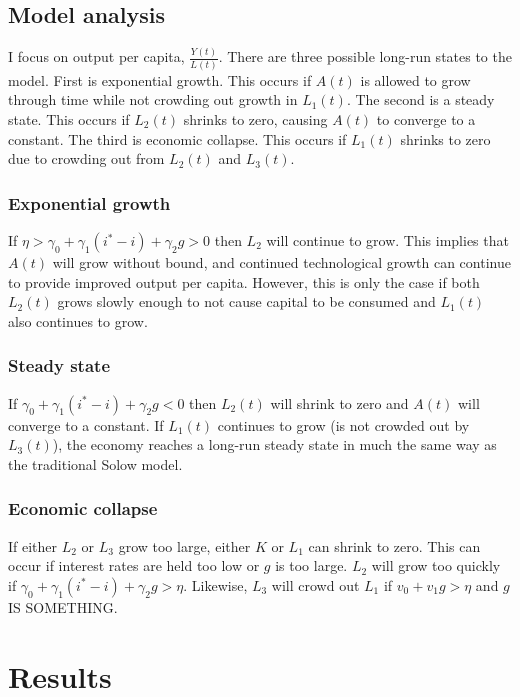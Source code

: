 \documentclass[12pt]{article}
\theoremstyle{definition}
\begin{document}
\subsection{Model analysis}

I focus on output per capita, \(\frac{Y(t)}{L(t)}\). There are three possible long-run states to the model.  First is exponential growth.  This occurs if \(A(t)\) is allowed to grow through time while not crowding out growth in \(L_1(t)\).  The second is a steady state.  This occurs if \(L_2(t)\) shrinks to zero, causing \(A(t)\) to converge to a constant.  The third is economic collapse.  This occurs if \(L_1(t)\) shrinks to zero due to crowding out from \(L_2(t)\) and \(L_3(t)\).  

\subsubsection{Exponential growth}
If \(\eta >\gamma_0+\gamma_1 (i^*-i)+\gamma_2 g > 0\) then \(L_2\) will continue to grow.  This implies that \(A(t)\) will grow without bound, and continued technological growth can continue to provide improved output per capita.  However, this is only the case if both \(L_2(t)\) grows slowly enough to not cause capital to be consumed and \(L_1(t)\) also continues to grow.  

\subsubsection{Steady state}
If \(\gamma_0+\gamma_1 (i^*-i)+\gamma_2 g <0\) then \(L_2(t)\) will shrink to zero and \(A(t)\) will converge to a constant.  If \(L_1(t)\) continues to grow (is not crowded out by \(L_3(t)\)), the economy reaches a long-run steady state in much the same way as the traditional Solow model.

\subsubsection{Economic collapse}
If either \(L_2\) or \(L_3\) grow too large, either \(K\) or \(L_1\) can shrink to zero.  This can occur if interest rates are held too low or \(g\) is too large.  \(L_2\) will grow too quickly if \(\gamma_0+\gamma_1 (i^*-i)+\gamma_2 g > \eta\).  Likewise, \(L_3\) will crowd out \(L_1\) if \(v_0+v_1g > \eta\) and \(g\) IS SOMETHING.

\section{Results}
\end{document}
